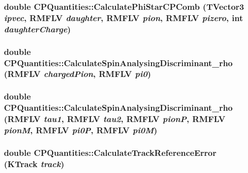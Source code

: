 \label{classCPQuantities_a9c1bb591c0cd39d7811f55ec11e85cf3}
\hypertarget{classCPQuantities_ab99f363dffcef31b9586c837345f8de3}{
\subsubsection[{CalculatePhiStarCPComb}]{\setlength{\rightskip}{0pt plus 5cm}double CPQuantities::CalculatePhiStarCPComb (TVector3 {\em ipvec}, \/  RMFLV {\em daughter}, \/  RMFLV {\em pion}, \/  RMFLV {\em pizero}, \/  int {\em daughterCharge})}}
\label{classCPQuantities_ab99f363dffcef31b9586c837345f8de3}
\hypertarget{classCPQuantities_a21ad326d0dc204211a393fc9f0cbc844}{
\subsubsection[{CalculateSpinAnalysingDiscriminant\_\-rho}]{\setlength{\rightskip}{0pt plus 5cm}double CPQuantities::CalculateSpinAnalysingDiscriminant\_\-rho (RMFLV {\em chargedPion}, \/  RMFLV {\em pi0})}}
\label{classCPQuantities_a21ad326d0dc204211a393fc9f0cbc844}
\hypertarget{classCPQuantities_a41459ffae38ce33912733b24136b0859}{
\subsubsection[{CalculateSpinAnalysingDiscriminant\_\-rho}]{\setlength{\rightskip}{0pt plus 5cm}double CPQuantities::CalculateSpinAnalysingDiscriminant\_\-rho (RMFLV {\em tau1}, \/  RMFLV {\em tau2}, \/  RMFLV {\em pionP}, \/  RMFLV {\em pionM}, \/  RMFLV {\em pi0P}, \/  RMFLV {\em pi0M})}}
\label{classCPQuantities_a41459ffae38ce33912733b24136b0859}
\hypertarget{classCPQuantities_a75ee8a45a17843c7bff05190732a7bb4}{
\subsubsection[{CalculateTrackReferenceError}]{\setlength{\rightskip}{0pt plus 5cm}double CPQuantities::CalculateTrackReferenceError (KTrack {\em track})}}
